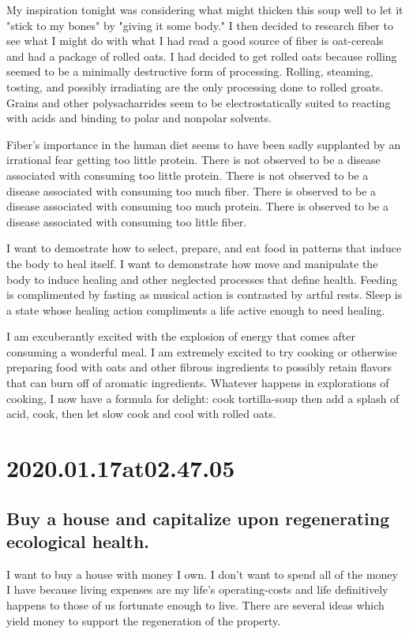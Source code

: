 My inspiration tonight was considering what might thicken this soup well to let it "stick to my bones" by "giving it some body."
I then decided to research fiber to see what I might do with what I had read a good source of fiber is oat-cereals and had a package of rolled oats.
I had decided to get rolled oats because rolling seemed to be a minimally destructive form of processing.
Rolling, steaming, tosting, and possibly irradiating are the only processing done to rolled groats.
Grains and other polysacharrides seem to be electrostatically suited to reacting with acids and binding to polar and nonpolar solvents.

Fiber's importance in the human diet seems to have been sadly supplanted by an irrational fear getting too little protein.
There is not observed to be a disease associated with consuming too little protein.
There is not observed to be a disease associated with consuming too much fiber.
There is observed to be a disease associated with consuming too much protein.
There is observed to be a disease associated with consuming too little fiber.

I want to demostrate how to select, prepare, and eat food in patterns that induce the body to heal itself.
I want to demonstrate how move and manipulate the body to induce healing and other neglected processes that define health.
Feeding is complimented by fasting as musical action is contrasted by artful rests.
Sleep is a state whose healing action compliments a life active enough to need healing.

I am excuberantly excited with the explosion of energy that comes after consuming a wonderful meal.
I am extremely excited to try cooking or otherwise preparing food with oats and other fibrous ingredients to possibly retain flavors that can burn off of aromatic ingredients.
Whatever happens in explorations of cooking, I now have a formula for delight: cook tortilla-soup then add a splash of acid, cook, then let slow cook and cool with rolled oats.

\section*{ 2020.01.17at02.47.05 }
\subsection*{ Buy a house and capitalize upon regenerating ecological health. }
I want to buy a house with money I own.
I don't want to spend all of the money I have because living expenses are my life's operating-costs and life definitively happens to those of us fortunate enough to live.
There are several ideas which yield money to support the regeneration of the property.

